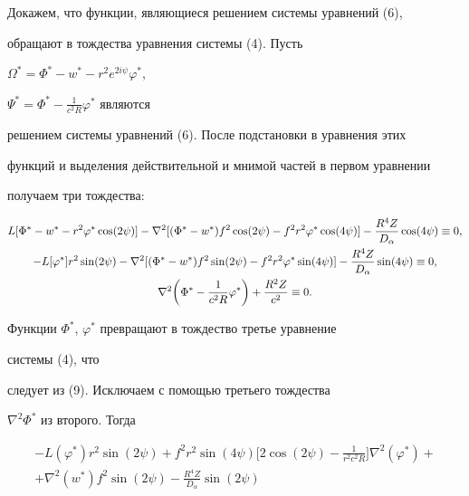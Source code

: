 \begin{pf}
 


Докажем, что функции, являющиеся решением системы уравнений (6), 


обращают в тождества уравнения системы (4). Пусть 


$\Omega^*=\Phi^*-w^*-r^2e^{2i\psi}\varphi^*$, 


$\Psi^*=\Phi^*-\frac{1}{c^2R}\varphi^*$ являются 


решением системы уравнений (6). После подстановки в уравнения этих 


функций и выделения действительной и мнимой частей в первом уравнении 


получаем три тождества: 


\begin{gather} 


L[\Phi^*-w^*-r^2\varphi^*\cos(2\psi)]- 


\nabla^2[(\Phi^*-w^*)f^2\cos(2\psi)-f^2r^2\varphi^* 


\cos(4\psi)]-\frac{R^4Z}{D_\alpha}\cos(4\psi)\equiv 0,\\ 


% 


-L[\varphi^*]r^2\sin(2\psi)- 


\nabla^2[(\Phi^*-w^*)f^2\sin(2\psi)-f^2r^2\varphi^* 


\sin(4\psi)]-\frac{R^4Z}{D_\alpha}\sin(4\psi)\equiv 0,\notag\\ 


% 


\nabla^2\bigg(\Phi^*-\frac{1}{c^2R}\varphi^*\bigg)+ 


\frac{R^2Z}{c^2}\equiv 0.\notag


\end{gather} 


Функции $\Phi^*$, $\varphi^*$ превращают в тождество третье уравнение 


системы (4), что 


следует из (9). Исключаем с помощью третьего тождества 


$\nabla^2\Phi^*$ из второго. Тогда 


\begin{multline*} 


-L(\varphi^*)r^2\sin(2\psi)+f^2r^2\sin(4\psi) 


\bigg[2\cos(2\psi)-\frac{1}{r^2c^2R}\bigg] 


\nabla^2(\varphi^*)+ \\ 


+\nabla^2(w^*)f^2\sin(2\psi)-\frac{R^4Z}{D_\alpha}\sin(2\psi) 



\end{multline*}
\end{pf}
